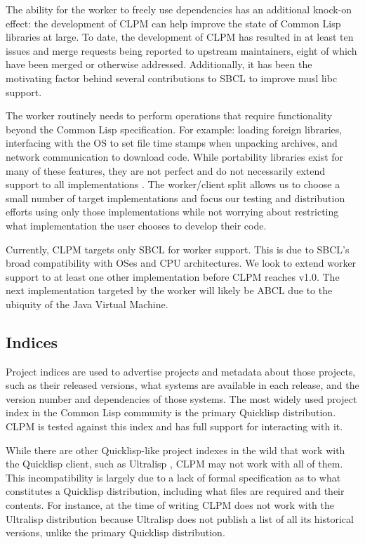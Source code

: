 \documentclass[sigconf]{acmart}
\begin{document}
The ability for the worker to freely use dependencies has an additional
knock-on effect: the development of CLPM can help improve the state of Common
Lisp libraries at large. To date, the development of CLPM has resulted in at
least ten issues and merge requests being reported to upstream maintainers,
eight of which have been merged or otherwise addressed. Additionally, it has
been the motivating factor behind several contributions to SBCL to improve musl
libc support.

The worker routinely needs to perform operations that require functionality
beyond the Common Lisp specification. For example: loading foreign libraries,
interfacing with the OS to set file time stamps when unpacking archives, and
network communication to download code. While portability libraries exist for
many of these features, they are not perfect and do not necessarily extend
support to all implementations \cite{portability}. The worker/client split
allows us to choose a small number of target implementations and focus our
testing and distribution efforts using only those implementations while not
worrying about restricting what implementation the user chooses to develop
their code.

Currently, CLPM targets only SBCL \cite{sbcl} for worker support. This is due
to SBCL's broad compatibility with OSes and CPU architectures. We look to
extend worker support to at least one other implementation before CLPM reaches
v1.0. The next implementation targeted by the worker will likely be ABCL
\cite{abcl} due to the ubiquity of the Java Virtual Machine.

\subsection{Indices}

Project indices are used to advertise projects and metadata about those
projects, such as their released versions, what systems are available in each
release, and the version number and dependencies of those systems. The most
widely used project index in the Common Lisp community is the primary Quicklisp
distribution. CLPM is tested against this index and has full support for
interacting with it.

While there are other Quicklisp-like project indexes in the wild that work with
the Quicklisp client, such as Ultralisp \cite{ultralisp}, CLPM may not work
with all of them. This incompatibility is largely due to a lack of formal
specification as to what constitutes a Quicklisp distribution, including what
files are required and their contents. For instance, at the time of writing
CLPM does not work with the Ultralisp distribution because Ultralisp does not
publish a list of all its historical versions, unlike the primary Quicklisp
distribution.
\end{document}
